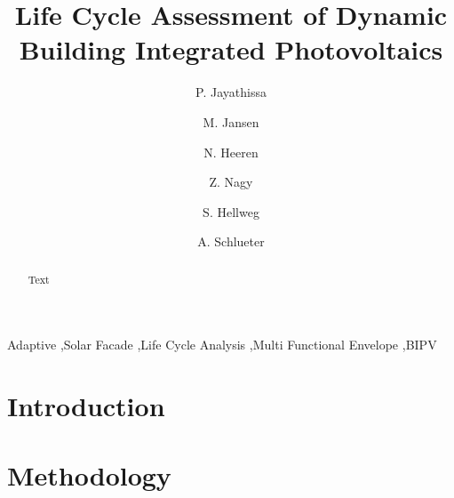\documentclass[preprint,12pt]{elsarticle} %
\begin{document}
\begin{frontmatter}

\title{Life Cycle Assessment of Dynamic Building Integrated Photovoltaics} 



\author[ita]{P. Jayathissa }
\address[ita]{Architecture and Building Systems, Institute of Technology in Architecture, Department of Architecture,\\ ETH Zurich, Switzerland} 

\author[ita]{M. Jansen}

\author[baug]{N. Heeren}
\address[baug]{Ecological System Design, Institute of Environmental Engineering,\\ ETH Zurich, Switzerland}

\author[ita]{Z. Nagy}

\author[baug]{S. Hellweg}


\author[ita]{A. Schlueter  }



\begin{abstract}
Text \\

\end{abstract}

\begin{keyword}
Adaptive \sep Solar Facade \sep Life Cycle Analysis \sep Multi Functional Envelope \sep BIPV
\end{keyword}

\end{frontmatter}

\section{Introduction}
\label{ch:introduction}


\section{Methodology}
\label{ch:method}

\end{document}
